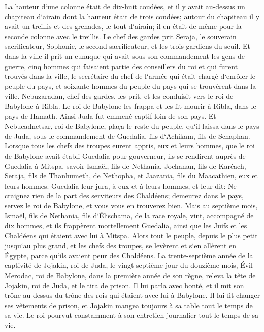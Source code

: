 \verse La hauteur d`une colonne était de dix-huit coudées, et il y avait au-dessus un chapiteau d`airain dont la hauteur était de trois coudées; autour du chapiteau il y avait un treillis et des grenades, le tout d`airain; il en était de même pour la seconde colonne avec le treillis. 
\verse Le chef des gardes prit Seraja, le souverain sacrificateur, Sophonie, le second sacrificateur, et les trois gardiens du seuil. 
\verse Et dans la ville il prit un eunuque qui avait sous son commandement les gens de guerre, cinq hommes qui faisaient partie des conseillers du roi et qui furent trouvés dans la ville, le secrétaire du chef de l`armée qui était chargé d`enrôler le peuple du pays, et soixante hommes du peuple du pays qui se trouvèrent dans la ville. 
\verse Nebuzaradan, chef des gardes, les prit, et les conduisit vers le roi de Babylone à Ribla. 
\verse Le roi de Babylone les frappa et les fit mourir à Ribla, dans le pays de Hamath. 
\verse Ainsi Juda fut emmené captif loin de son pays. Et Nebucadnetsar, roi de Babylone, plaça le reste du peuple, qu`il laissa dans le pays de Juda, sous le commandement de Guedalia, fils d`Achikam, fils de Schaphan. 
\verse Lorsque tous les chefs des troupes eurent appris, eux et leurs hommes, que le roi de Babylone avait établi Guedalia pour gouverneur, ils se rendirent auprès de Guedalia à Mitspa, savoir Ismaël, fils de Nethania, Jochanan, fils de Karéach, Seraja, fils de Thanhumeth, de Nethopha, et Jaazania, fils du Maacathien, eux et leurs hommes. 
\verse Guedalia leur jura, à eux et à leurs hommes, et leur dit: Ne craignez rien de la part des serviteurs des Chaldéens; demeurez dans le pays, servez le roi de Babylone, et vous vous en trouverez bien. 
\verse Mais au septième mois, Ismaël, fils de Nethania, fils d`Élischama, de la race royale, vint, accompagné de dix hommes, et ils frappèrent mortellement Guedalia, ainsi que les Juifs et les Chaldéens qui étaient avec lui à Mitspa. 
\verse Alors tout le peuple, depuis le plus petit jusqu`au plus grand, et les chefs des troupes, se levèrent et s`en allèrent en Égypte, parce qu`ils avaient peur des Chaldéens. 
\verse La trente-septième année de la captivité de Jojakin, roi de Juda, le vingt-septième jour du douzième mois, Évil Merodac, roi de Babylone, dans la première année de son règne, releva la tête de Jojakin, roi de Juda, et le tira de prison. 
\verse Il lui parla avec bonté, et il mit son trône au-dessus du trône des rois qui étaient avec lui à Babylone. 
\verse Il lui fit changer ses vêtements de prison, et Jojakin mangea toujours à sa table tout le temps de sa vie. 
\verse Le roi pourvut constamment à son entretien journalier tout le temps de sa vie. 
